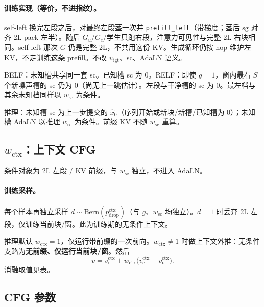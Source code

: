 \documentclass[UTF8,a4paper,11pt]{ctexart}
\begin{document}
\paragraph{训练实现（等价，不进指纹）。}
self-left 换完左段之后，对最终左段茎一次并 \texttt{prefill\_left}（带梯度；茎后 \(\mathrm{sg}\) 对齐 2L pack 左半）。随后 \(G_u\)/\(G_c\)/学生只跑右段，注意力可见性与完整 2L 右块相同。self-left 那次 \(G\) 仍是完整 2L，不共用这份 KV。生成循环仍按 hop 维护左 KV，不走训练这条 prefill。不改 \(v_{\mathrm{tgt}}\)、sc、AdaLN 语义。

BELF：未知槽共享同一套 sc。已知槽 sc 为 0。RELF：即使 \(g=1\)，窗内最右 \(S\) 个新噪声槽的 sc 仍为 \(0\)（尚无上一跳估计）。左段与干净槽的 sc 为 \(0\)。最左档与其余未知档同样以 \(w_{\mathrm{sc}}\) 为条件。

推理：未知槽 sc 为上一步提交的 \(\hat x_0\)（序列开始或新块/新槽/已知槽为 \(0\)）；未知槽 AdaLN 以推理 \(w_{\mathrm{sc}}\) 为条件。前缀 KV 不随 \(w_{\mathrm{sc}}\) 重算。

\subsection{\texorpdfstring{\(w_{\mathrm{ctx}}\)：上下文 CFG}{w_ctx：上下文 CFG}}

条件对象为 2L 左段 / KV 前缀，与 \(w_{\mathrm{sc}}\) 独立，不进入 AdaLN。

\paragraph{训练采样。}
每个样本再独立采样 \(d\sim\mathrm{Bern}(p_{\mathrm{drop}}^{\mathrm{ctx}})\)（与 \(g\)、\(w_{\mathrm{sc}}\) 均独立）。\(d=1\) 时丢弃 2L 左段，仅训练当前块/窗。此为训练期的无条件上下文。

推理默认 \(w_{\mathrm{ctx}}=1\)，仅运行带前缀的一次前向。\(w_{\mathrm{ctx}}\neq 1\) 时做上下文外推：无条件支路为\textbf{无前缀、仅运行当前块/窗}。然后
\[
v=v_{\mathrm{u}}^{\mathrm{ctx}}+w_{\mathrm{ctx}}\bigl(v_{\mathrm{c}}^{\mathrm{ctx}}-v_{\mathrm{u}}^{\mathrm{ctx}}\bigr).
\]
消融取值见表。

\subsection{CFG 参数}
\end{document}
